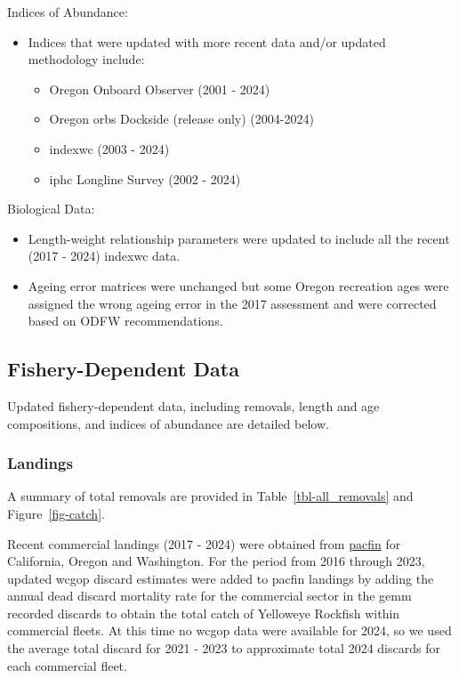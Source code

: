 \documentclass[
]{scrartcl}
\providecommand{\tightlist}{%
  \setlength{\itemsep}{0pt}\setlength{\parskip}{0pt}}\usepackage{longtable,booktabs,array}
\begin{document}
Indices of Abundance:

\begin{itemize}
\tightlist
\item
  Indices that were updated with more recent data and/or updated
  methodology include:

  \begin{itemize}
  \tightlist
  \item
    Oregon Onboard Observer (2001 - 2024)
  \item
    Oregon \gls{orbs} Dockside (release only) (2004-2024)
  \item
    \gls{indexwc} (2003 - 2024)
  \item
    \gls{iphc} Longline Survey (2002 - 2024)
  \end{itemize}
\end{itemize}

Biological Data:

\begin{itemize}
\tightlist
\item
  Length-weight relationship parameters were updated to include all the
  recent (2017 - 2024) \gls{indexwc} data.
\item
  Ageing error matrices were unchanged but some Oregon recreation ages
  were assigned the wrong ageing error in the 2017 assessment and were
  corrected based on ODFW recommendations.
\end{itemize}

\subsection{Fishery-Dependent Data}\label{fishery-dependent-data}

Updated fishery-dependent data, including removals, length and age
compositions, and indices of abundance are detailed below.

\subsubsection{Landings}\label{landings}

A summary of total removals are provided in Table~\ref{tbl-all_removals}
and Figure~\ref{fig-catch}.

Recent commercial landings (2017 - 2024) were obtained from
\href{www.pacfin.psmfc.org}{\gls{pacfin}} for California, Oregon and
Washington. For the period from 2016 through 2023, updated \gls{wcgop}
discard estimates were added to \gls{pacfin} landings by adding the
annual dead discard mortality rate for the commercial sector in the
\gls{gemm} recorded discards to obtain the total catch of Yelloweye
Rockfish within commercial fleets. At this time no \gls{wcgop} data were
available for 2024, so we used the average total discard for 2021 - 2023
to approximate total 2024 discards for each commercial fleet.
\end{document}
